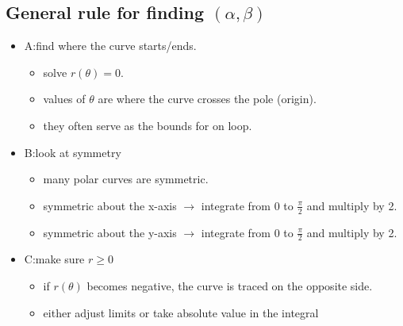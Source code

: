 \documentclass{article}
\begin{document}
                     \subsection{General rule for finding \((\alpha , \beta)\)}
                        \begin{itemize}
                            \item A:find where the curve starts/ends. 
                                \begin{itemize}
                                    \item solve \(r(\theta) = 0\). 
                                    \item values of \(\theta\) are where the curve crosses the pole (origin). 
                                    \item they often serve as the bounds for on loop. 
                                \end{itemize}
                            \item B:look at symmetry 
                                \begin{itemize}
                                    \item many polar curves are symmetric. 
                                    \item symmetric about the x-axis \(\rightarrow\) integrate from 0 to \(\frac{\pi}{2}\) and multiply by 2. 
                                    \item symmetric about the y-axis \(\rightarrow\) integrate from 0 to \(\frac{\pi}{2}\) and multiply by 2. 
                                \end{itemize}
                            \item C:make sure \(r \geq 0 \)
                                \begin{itemize}
                                    \item if \(r(\theta)\) becomes negative, the curve is traced on the opposite side. 
                                    \item either adjust limits or take absolute value in the integral
                                \end{itemize}

                        \end{itemize}
                
\end{document}
